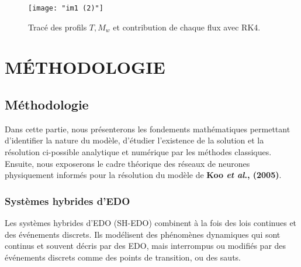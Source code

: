 \documentclass[12pt, oneside]{report} %
\theoremstyle{definition}
\theoremstyle{remark}
\begin{document}
	\clearpage
	\begin{landscape}
			\begin{figure}
			\centering
			\texttt{[image: "im1 (2)"]}
			\vspace{0.3cm}
		\caption{\Large Tracé des profils $T, M_w$ et contribution de chaque flux avec RK4.}
			\label{fig:im1-2}
		\end{figure}
	\end{landscape}
		

	\part*{MÉTHODOLOGIE}	
	
	\chapter{Méthodologie}
	\label{chp:generalité}

	Dans cette partie, nous présenterons les fondements mathématiques permettant d'identifier la nature du modèle, d'étudier l'existence de la solution et la résolution ci-possible analytique et numérique par les méthodes classiques. Ensuite, nous exposerons le cadre théorique des réseaux de neurones physiquement informés pour la résolution du modèle de \textbf{Koo \textit{et al}., (2005)}.
	
	
	\section{Systèmes hybrides d'EDO} 
	\label{sec:gen-EDO}
	
	Les systèmes hybrides d'EDO (SH-EDO) combinent à la fois des lois continues et des événements discrets. Ils modélisent des phénomènes dynamiques qui sont continus et souvent décris par des EDO, mais interrompus ou modifiés par des événements discrets comme des points de transition, ou des sauts.
	
\end{document}
